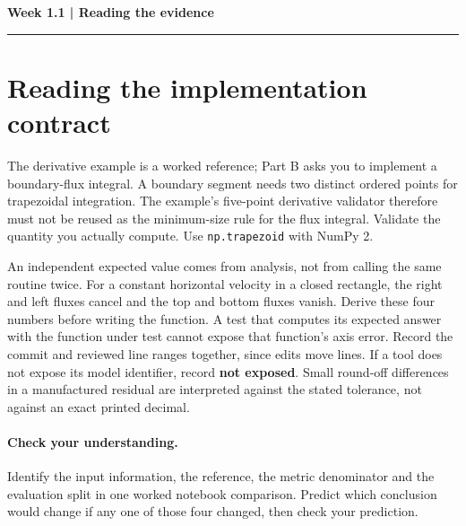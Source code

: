 \documentclass[11pt]{article}
\begin{document}
\noindent\textbf{Week 1.1 | Reading the evidence}\par\medskip\hrule\medskip
\section*{Reading the implementation contract}
The derivative example is a worked reference; Part B asks you to implement a
boundary-flux integral. A boundary segment needs two distinct ordered points for
trapezoidal integration. The example's five-point derivative validator therefore
must not be reused as the minimum-size rule for the flux integral. Validate the
quantity you actually compute. Use \texttt{np.trapezoid} with NumPy 2.

An independent expected value comes from analysis, not from calling the same
routine twice. For a constant horizontal velocity in a closed rectangle, the
right and left fluxes cancel and the top and bottom fluxes vanish. Derive these
four numbers before writing the function. A test that computes its expected
answer with the function under test cannot expose that function's axis error.
Record the commit and reviewed line ranges together, since edits move lines.
If a tool does not expose its model identifier, record \textbf{not exposed}. Small
round-off differences in a manufactured residual are interpreted against the
stated tolerance, not against an exact printed decimal.
\paragraph{Check your understanding.}
Identify the input information, the reference, the metric denominator and the
evaluation split in one worked notebook comparison. Predict which conclusion
would change if any one of those four changed, then check your prediction.
\end{document}
